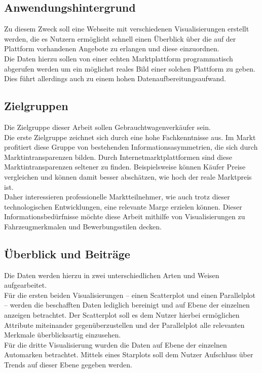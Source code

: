 \subsection{Anwendungshintergrund}
Zu diesem Zweck soll eine Webseite mit verschiedenen Visualisierungen erstellt werden, die es Nutzern ermöglicht schnell einen Überblick über die auf der Plattform vorhandenen Angebote zu erlangen und diese einzuordnen. \\
Die Daten hierzu sollen von einer echten Marktplattform programmatisch abgerufen werden um ein möglichst reales Bild einer solchen Plattform zu geben. Dies führt allerdings auch zu einem hohen Datenaufbereitungsaufwand.\\
\subsection{Zielgruppen}
Die Zielgruppe dieser Arbeit sollen Gebrauchtwagenverkäufer sein. \\
Die erste Zielgruppe zeichnet sich durch eine hohe Fachkenntnisse aus. Im Markt profitiert diese Gruppe von bestehenden Informationsasymmetrien, die sich durch Marktintransparenzen bilden. Durch Internetmarktplattformen sind diese Marktintransparenzen seltener zu finden. Beispielsweise können Käufer Preise vergleichen und können damit besser abschätzen, wie hoch der reale Marktpreis ist. \\
Daher interessieren professionelle Marktteilnehmer, wie auch trotz dieser technologischen Entwicklungen, eine relevante Marge erzielen können. 
Dieser Informationsbedürfnisse möchte diese Arbeit mithilfe von Visualisierungen zu Fahrzeugmerkmalen und Bewerbungsstilen decken. \\


\subsection{Überblick und Beiträge}
Die Daten werden hierzu in zwei unterschiedlichen Arten und Weisen aufgearbeitet. \\
Für die ersten beiden Visualisierungen – einen Scatterplot und einen Parallelplot – werden die beschafften Daten lediglich bereinigt und auf Ebene der einzelnen anzeigen betrachtet. 
Der Scatterplot soll es dem Nutzer hierbei ermöglichen Attribute miteinander gegenüberzustellen und der Parallelplot alle relevanten Merkmale überblicksartig einzusehen. \\
Für die dritte Visualisierung wurden die Daten auf Ebene der einzelnen Automarken betrachtet. Mittels eines Starplots soll dem Nutzer Aufschluss über Trends auf dieser Ebene gegeben werden. \\
